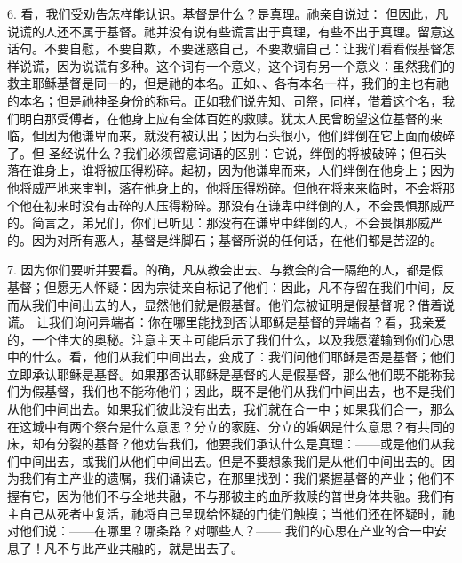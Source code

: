6.  看，我们受劝告怎样能认识。基督是什么？是真理。祂亲自说过： 但因此，凡说谎的人还不属于基督。祂并没有说有些谎言出于真理，有些不出于真理。留意这话句。不要自慰，不要自欺，不要迷惑自己，不要欺骗自己：让我们看看假基督怎样说谎，因为说谎有多种。这个词有一个意义，这个词有另一个意义：虽然我们的救主耶稣基督是同一的，但是祂的本名。正如、、各有本名一样，我们的主也有祂的本名；但是祂神圣身份的称号。正如我们说先知、司祭，同样，借着这个名，我们明白那受傅者，在他身上应有全体百姓的救赎。犹太人民曾盼望这位基督的来临，但因为他谦卑而来，就没有被认出；因为石头很小，他们绊倒在它上面而破碎了。但 圣经说什么？我们必须留意词语的区别：它说，绊倒的将被破碎；但石头落在谁身上，谁将被压得粉碎。起初，因为他谦卑而来，人们绊倒在他身上；因为他将威严地来审判，落在他身上的，他将压得粉碎。但他在将来来临时，不会将那个他在初来时没有击碎的人压得粉碎。那没有在谦卑中绊倒的人，不会畏惧那威严的。简言之，弟兄们，你们已听见：那没有在谦卑中绊倒的人，不会畏惧那威严的。因为对所有恶人，基督是绊脚石；基督所说的任何话，在他们都是苦涩的。\par

7. 因为你们要听并要看。的确，凡从教会出去、与教会的合一隔绝的人，都是假基督；但愿无人怀疑：因为宗徒亲自标记了他们：因此，凡不存留在我们中间，反而从我们中间出去的人，显然他们就是假基督。他们怎被证明是假基督呢？借着说谎。 让我们询问异端者：你在哪里能找到否认耶稣是基督的异端者？看，我亲爱的，一个伟大的奥秘。注意主天主可能启示了我们什么，以及我愿灌输到你们心思中的什么。看，他们从我们中间出去，变成了：我们问他们耶稣是否是基督；他们立即承认耶稣是基督。如果那否认耶稣是基督的人是假基督，那么他们既不能称我们为假基督，我们也不能称他们；因此，既不是他们从我们中间出去，也不是我们从他们中间出去。如果我们彼此没有出去，我们就在合一中；如果我们合一，那么在这城中有两个祭台是什么意思？分立的家庭、分立的婚姻是什么意思？有共同的床，却有分裂的基督？他劝告我们，他要我们承认什么是真理：——或是他们从我们中间出去，或我们从他们中间出去。但是不要想象我们是从他们中间出去的。因为我们有主产业的遗嘱，我们诵读它，在那里找到：我们紧握基督的产业；他们不握有它，因为他们不与全地共融，不与那被主的血所救赎的普世身体共融。我们有主自己从死者中复活，祂将自己呈现给怀疑的门徒们触摸；当他们还在怀疑时，祂对他们说：——在哪里？哪条路？对哪些人？—— 我们的心思在产业的合一中安息了！凡不与此产业共融的，就是出去了。\par

